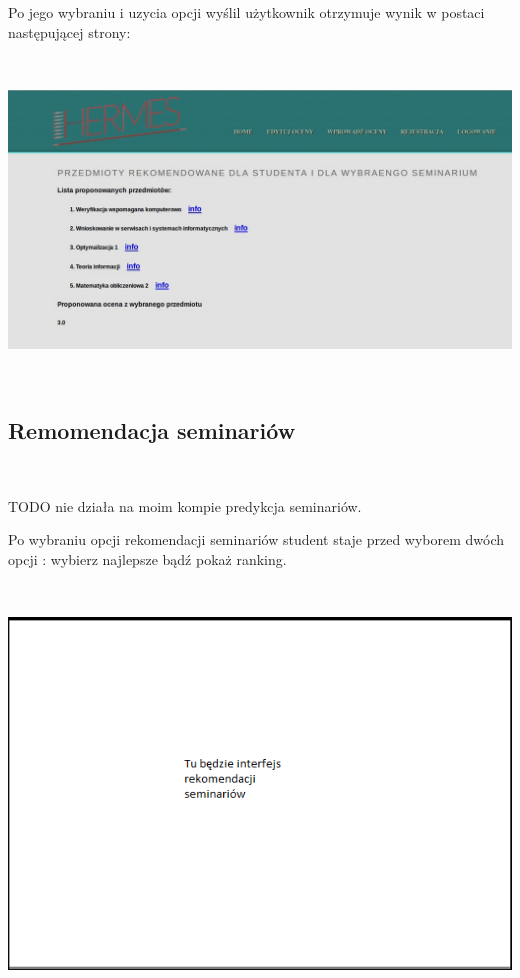 \documentclass[licencjacka]{pracamgr}
\begin{document}
Po jego wybraniu i uzycia opcji wyślil użytkownik otrzymuje wynik w postaci następującej strony: \\ \par 
 ~\\
\begin{minipage}{\linewidth}
	\centering
           \includegraphics[scale=0.5]{predykcjaPrzedmResult.jpg}
\end{minipage} \\ 

\subsection{Remomendacja seminariów}
~\\ \indent

TODO nie działa na moim kompie predykcja seminariów.

Po wybraniu opcji rekomendacji seminariów student staje przed wyborem dwóch opcji : wybierz najlepsze bądź pokaż ranking. \par 
~\\
\begin{minipage}{\linewidth}
	\centering
           \includegraphics[scale=0.7]{reksem.png}
\end{minipage} \\ 
\end{document}
